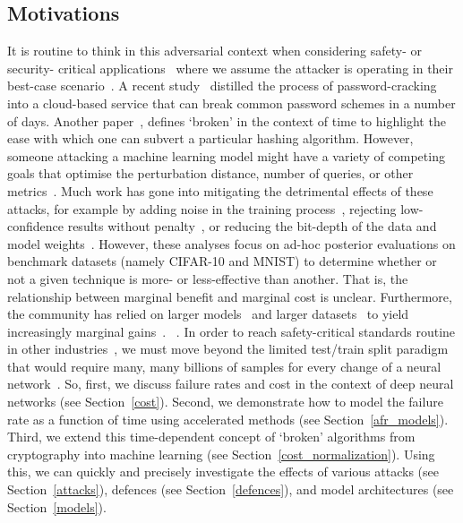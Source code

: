 \subsection{Motivations}
It is routine to think in this adversarial context when considering safety- or security- critical applications~\cite{ai_medical_imaging,ai_security,ai_prison,ai_aviation,ai_luggage} where we assume the attacker is operating in their best-case scenario~\cite{leurent2020sha,kamal2017study,madry2017towards,pixelattack,deepfool,croce_reliable_2020}. A recent study~\cite{kamal2017study} distilled the process of password-cracking into a cloud-based service that can break common password schemes in a number of days. Another paper~\cite{leurent2020sha}, defines `broken' in the context of time to highlight the ease with which one can subvert a particular hashing algorithm. However, someone attacking a machine learning model might have a variety of competing goals that optimise the perturbation distance, number of queries, or other metrics~\cite{madry2017towards,hopskipjump,pixelattack,fgm,deepfool}. Much work has gone into mitigating the detrimental effects of these attacks, for example by adding noise in the training process~\cite{gauss_aug,gauss_out}, rejecting low-confidence results without penalty~\cite{high_conf}, or reducing the bit-depth of the data and model weights~\cite{feature_squeezing}. However, these analyses focus on ad-hoc posterior evaluations on benchmark datasets (namely CIFAR-10 and MNIST) to determine whether or not a given technique is more- or less-effective than another. That is, the relationship between marginal benefit and marginal cost is unclear. Furthermore, the community has relied on larger models~\cite{desislavov2021compute} and larger datasets~\cite{desislavov2021compute,bailly2022effects} to yield increasingly marginal gains~\cite{sun2017revisiting}. ~. In order to reach safety-critical standards routine in other industries~\cite{iso26262,IEC61508,IEC62034}, we must move beyond the limited test/train split paradigm that would require many, many billions of samples for every change of a neural network~\cite{meyers}. So, first, we discuss failure rates and cost in the context of deep neural networks (see Section~\ref{cost}). Second, we demonstrate how to model the failure rate as a function of time  using accelerated methods (see Section~\ref{afr_models}). Third, we extend this time-dependent concept of `broken' algorithms from cryptography into machine learning (see Section~\ref{cost_normalization}). Using this, we can quickly and precisely investigate the effects of various attacks (see Section~\ref{attacks}), defences (see Section~\ref{defences}), and model architectures (see Section~\ref{models}).


